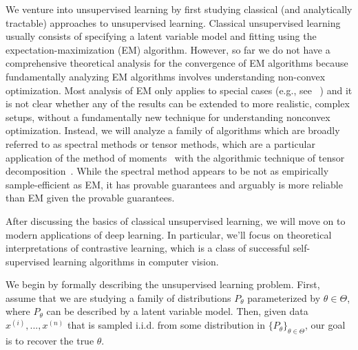 \newcommand{\jnote}[1]{{\color{red}\authnoteimp{JH}{#1}}}


We venture into unsupervised learning by first studying classical (and analytically tractable) approaches to unsupervised learning. Classical unsupervised learning usually consists of specifying a latent variable model and fitting using the expectation-maximization (EM) algorithm. However, so far we do not have a comprehensive theoretical analysis for the convergence of EM algorithms because fundamentally analyzing EM algorithms involves understanding non-convex optimization. Most analysis of EM only applies to special cases (e.g., see ~\citet{xu2016global,daskalakis2016ten}) and it is not clear whether any of the results can be extended to more realistic, complex setups, without a fundamentally new technique for understanding nonconvex optimization. 
Instead, we will analyze a family of algorithms which are broadly referred to as spectral methods or tensor methods, which are a particular application of the method of moments~\citep{pearson1894} with the algorithmic technique of tensor decomposition~\citep{anandkumar2015learning}. While the spectral method appears to be not as empirically sample-efficient as EM, it has provable guarantees and arguably is more reliable than EM given the provable guarantees.

After discussing the basics of classical unsupervised learning, we will move on to modern applications of deep learning. In particular, we'll focus on theoretical interpretations of contrastive learning, which is a class of successful self-supervised learning algorithms in computer vision. 


We begin by formally describing the unsupervised learning problem. First, assume that we are studying a family of distributions $P_{\theta}$ parameterized by $\theta \in \Theta$, where $P_{\theta}$ can be described by a latent variable model. Then, given data $x^{(i)},...,x^{(n)}$ that is sampled i.i.d. from some distribution in $\{P_\theta\}_{\theta \in \Theta}$, our goal is to recover the true $\theta$. 

